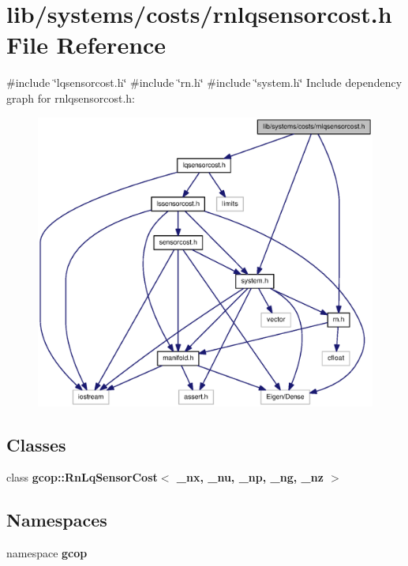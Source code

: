 \section{lib/systems/costs/rnlqsensorcost.h \-File \-Reference}
\label{rnlqsensorcost_8h}
{\ttfamily \#include \char`\"{}lqsensorcost.\-h\char`\"{}}\*
{\ttfamily \#include \char`\"{}rn.\-h\char`\"{}}\*
{\ttfamily \#include \char`\"{}system.\-h\char`\"{}}\*
\-Include dependency graph for rnlqsensorcost.\-h\-:\nopagebreak
\begin{figure}[H]
\begin{center}
\leavevmode
\includegraphics[width=350pt]{rnlqsensorcost_8h__incl}
\end{center}
\end{figure}
\subsection*{\-Classes}
\begin{DoxyCompactItemize}
\item 
class {\bf gcop\-::\-Rn\-Lq\-Sensor\-Cost$<$ \-\_\-nx, \-\_\-nu, \-\_\-np, \-\_\-ng, \-\_\-nz $>$}
\end{DoxyCompactItemize}
\subsection*{\-Namespaces}
\begin{DoxyCompactItemize}
\item 
namespace {\bf gcop}
\end{DoxyCompactItemize}
